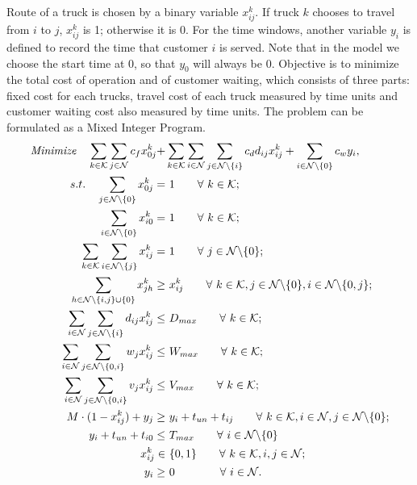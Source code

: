 \documentclass[12pt]{article}
\numberwithin{equation}{section}
\begin{document}
	\paragraph{}Route of a truck is chosen by a binary variable $x_{ij}^k$. If truck $k$ chooses to travel from $i$ to $j$, $x_{ij}^k$ is 1; otherwise it is 0. For the time windows, another variable $y_i$ is defined to record the time that customer $i$ is served. Note that in the model we choose the start time at 0, so that $y_0$ will always be 0. Objective is to minimize the total cost of operation and of customer waiting, which consists of three parts: fixed cost for each trucks, travel cost of each truck measured by time units and customer waiting cost also measured by time units. The problem can be formulated as a Mixed Integer Program.
	\begin{align}
	\text{\emph{Minimize}} \quad  \sum_{k\in \mathcal{K}}\sum_{j\in \mathcal{N}}c_f x^k_{0j}
			+&\sum_{k\in\mathcal{K}}\sum_{i\in \mathcal{N}}\sum_{j\in \mathcal{N}\backslash\{i\}}c_d d_{ij}x^k_{ij} + \sum_{i\in \mathcal{N}\backslash\{0\}}c_w y_i,\\
	s.t. \quad   \sum_{j\in\mathcal{N}\backslash\{0\}}x^k_{0j} =&\  1  \qquad \forall\  k \in \mathcal{K};\\
		 \sum_{i\in\mathcal{N}\backslash\{0\}}x^k_{i0} =&\  1  \qquad \forall\  k \in \mathcal{K};\\
		 \sum_{k\in\mathcal{K}}\sum_{i\in\mathcal{N}\backslash\{j\}}x^k_{ij} =&\  1 \qquad \forall\  j \in \mathcal{N}\backslash\{0\};\\
		 \sum_{h\in\mathcal{N}\backslash\{i,j\}\cup\{0\}}x^k_{jh}\ge&\  x^k_{ij} \qquad \forall\  k \in \mathcal{K}, j \in \mathcal{N}\backslash\{0\}, i\in \mathcal{N}\backslash\{0, j\};\\		
		 \sum_{i\in\mathcal{N}}\sum_{j\in\mathcal{N}\backslash\{i\}}d_{ij}x^k_{ij} \le&\  D_{max} \qquad \forall\  k \in \mathcal{K};\\
		 \sum_{i\in\mathcal{N}}\sum_{j\in\mathcal{N}\backslash\{0,i\}}w_{j}x^k_{ij} \le&\  W_{max} \qquad \forall\  k \in \mathcal{K};\\
		 \sum_{i\in\mathcal{N}}\sum_{j\in\mathcal{N}\backslash\{0,i\}}v_{j}x^k_{ij} \le&\  V_{max} \qquad \forall\  k \in \mathcal{K};\\		
		 M\cdot (1-x^k_{ij}) + y_{j} \ge&\  y_i + t_{un} + t_{ij} \qquad \forall\  k \in \mathcal{K}, i\in \mathcal{N}, j\in \mathcal{N}\backslash\{0\};\\
		 y_i + t_{un} + t_{i0} \le&\  T_{max} \qquad \forall\  i\in \mathcal{N}\backslash\{0\}\\
		 x^k_{ij} \in&\  \{0,1\} \qquad \forall\  k\in \mathcal{K},i, j\in \mathcal{N};\\
		 y_i \ge&\  0 \qquad \qquad \forall\  i\in \mathcal{N}.
	\end{align}
	
\end{document}
